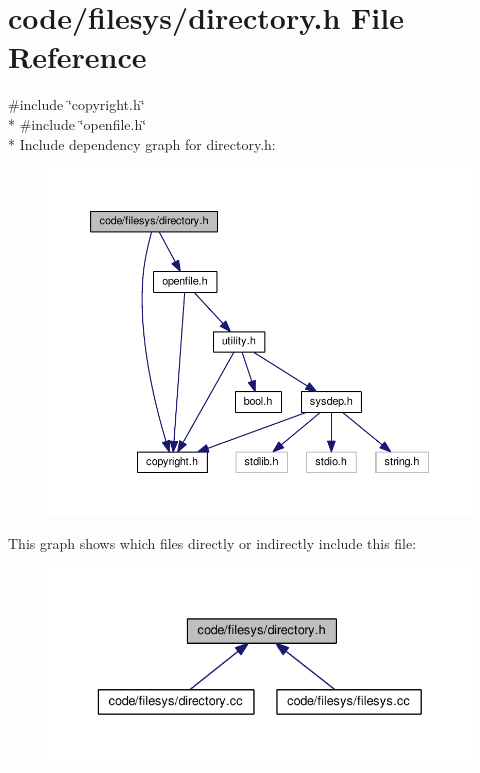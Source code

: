 \section{code/filesys/directory.h File Reference}
\label{directory_8h}
{\ttfamily \#include \char`\"{}copyright.\+h\char`\"{}}\\*
{\ttfamily \#include \char`\"{}openfile.\+h\char`\"{}}\\*
Include dependency graph for directory.\+h\+:
\nopagebreak
\begin{figure}[H]
\begin{center}
\leavevmode
\includegraphics[width=350pt]{directory_8h__incl}
\end{center}
\end{figure}
This graph shows which files directly or indirectly include this file\+:
\nopagebreak
\begin{figure}[H]
\begin{center}
\leavevmode
\includegraphics[width=336pt]{directory_8h__dep__incl}
\end{center}
\end{figure}
